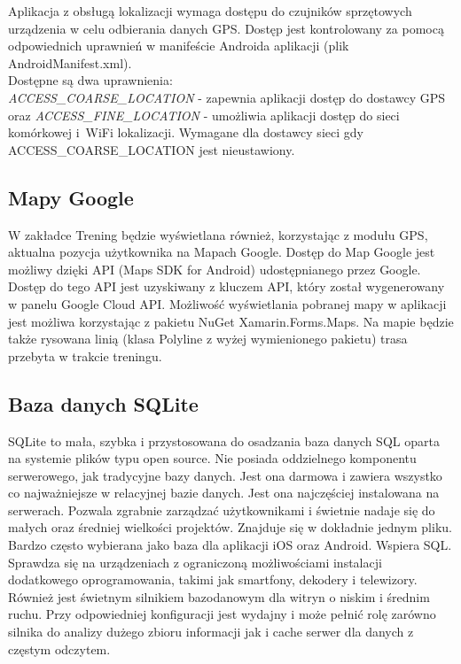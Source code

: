 \hspace{0.60cm}Aplikacja z obsługą lokalizacji wymaga dostępu do czujników sprzętowych urządzenia w celu odbierania danych GPS. Dostęp jest kontrolowany za pomocą odpowiednich uprawnień w manifeście Androida aplikacji (plik AndroidManifest.xml). \\ Dostępne są dwa uprawnienia: \\ \textit{ACCESS\_COARSE\_LOCATION} - zapewnia aplikacji dostęp do dostawcy GPS oraz \textit{ACCESS\_FINE\_LOCATION} - umożliwia aplikacji dostęp do sieci komórkowej i~WiFi lokalizacji. Wymagane dla dostawcy sieci gdy ACCESS\_COARSE\_LOCATION jest nieustawiony.

\subsection{Mapy Google}  %

\hspace{0.60cm}W zakładce Trening będzie wyświetlana również, korzystając z modułu GPS, aktualna pozycja użytkownika na Mapach Google. Dostęp do Map Google jest możliwy dzięki API (Maps SDK for Android) udostępnianego przez Google. Dostęp do tego API jest uzyskiwany z kluczem API, który został wygenerowany w panelu Google Cloud API. Możliwość wyświetlania pobranej mapy w aplikacji jest możliwa korzystając z pakietu NuGet Xamarin.Forms.Maps. Na mapie będzie także rysowana linią (klasa Polyline z wyżej wymienionego pakietu) trasa przebyta w trakcie treningu. 

\subsection{Baza danych SQLite} %

\hspace{0.60cm}SQLite to mała, szybka i przystosowana do osadzania baza danych SQL oparta na systemie plików typu open source. Nie posiada oddzielnego komponentu serwerowego, jak tradycyjne bazy danych. Jest ona darmowa i zawiera wszystko co najważniejsze w relacyjnej bazie danych. Jest ona najczęściej instalowana na serwerach. Pozwala zgrabnie zarządzać użytkownikami i świetnie nadaje się do małych oraz średniej wielkości projektów. Znajduje się w dokładnie jednym pliku. Bardzo często wybierana jako baza dla aplikacji iOS oraz Android. Wspiera SQL. Sprawdza się na urządzeniach z ograniczoną możliwościami instalacji dodatkowego oprogramowania, takimi jak smartfony, dekodery i telewizory. Również jest świetnym silnikiem bazodanowym dla witryn o niskim i średnim ruchu. Przy odpowiedniej konfiguracji jest wydajny i może pełnić rolę zarówno silnika do analizy dużego zbioru informacji jak i cache serwer dla danych z częstym odczytem.


